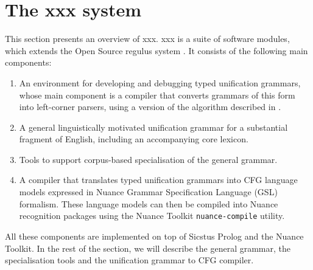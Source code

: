 \documentclass[11pt]{article}
\begin{document}

\section{The {\sc xxx} system}
\label{Section:Regulus2}

This section presents an overview of {\sc xxx}.  {\sc xxx} is a suite
of software modules, which extends the Open Source {\sc regulus}
system \cite{RaynerDowdingHockey2001}. It consists of the following
main components:

\begin{enumerate}

\item An environment for developing and debugging typed unification
grammars, whose main component is a compiler that converts grammars
of this form into left-corner parsers, using a version of the 
algorithm described in \cite{Moore2000b}.

\item A general linguistically motivated unification grammar for a
substantial fragment of English, including an accompanying core
lexicon.

\item Tools to support corpus-based specialisation of the general
grammar.

\item A compiler that translates typed unification grammars into
CFG language models expressed in Nuance Grammar Specification
Language (GSL) formalism. These language models can then be compiled
into Nuance recognition packages using the Nuance Toolkit {\tt nuance-compile}
utility.

\end{enumerate}

All these components are implemented on top of Sicstus Prolog
and the Nuance Toolkit. 
In the rest of the section,
we will describe the general grammar, the specialisation tools and the
unification grammar to CFG compiler.
\end{document}
